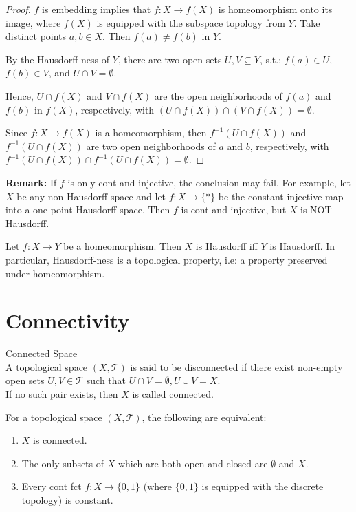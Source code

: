 \begin{proof}
    $f$ is embedding implies that $f:X \rightarrow f(X)$ is homeomorphism onto its image, where $f(X)$ is equipped with the subspace topology from $Y$.
    Take distinct points $a,b \in X$. Then $f(a) \neq f(b)$ in $Y$. 
    
    By the Hausdorff-ness of $Y$, there are two open sets $U,V \subseteq Y$, s.t.: $f(a) \in U$, $f(b) \in V$, and $U \cap V=\emptyset$.
    
    Hence, $U \cap f(X)$ and $V \cap f(X)$ are the open neighborhoods of $f(a)$ and $f(b)$ in $f(X)$, respectively, with $(U\cap f(X)) \cap (V \cap f(X))= \emptyset$.
    
    Since $f: X \rightarrow f(X)$ is a homeomorphism, then $f^{-1}(U \cap f(X))$ and $f^{-1}(U \cap f(X))$ are two open neighborhoods of $a$ and $b$, respectively, with $f^{-1}(U \cap f(X))\cap f^{-1}(U \cap f(X)) = \emptyset$.
\end{proof}

\noindent\textbf{Remark:} If $f$ is only cont and injective, the conclusion may fail. For example, let $X$ be any non-Hausdorff space and let $f: X\rightarrow\{*\}$ be the constant injective map into a one-point Hausdorff space. Then $f$ is cont and injective, but $X$ is NOT Hausdorff.

\begin{corollary}
    Let $f: X \rightarrow Y$ be a homeomorphism. Then $X$ is Hausdorff iff $Y$ is Hausdorff. In particular, Hausdorff-ness is a topological property, i.e: a property preserved under homeomorphism.
\end{corollary}

\section{Connectivity}

\begin{definition}{Connected Space}\\
A topological space $(X, \mathcal{T})$ is said to be disconnected if there exist non-empty open sets $U,V \in \mathcal{T}$ such that $U \cap V = \emptyset , U \cup V = X$.\\
If no such pair exists, then $X$ is called connected.
\end{definition}

\begin{proposition}
    For a topological space $(X, \mathcal{T})$, the following are equivalent:
    \begin{enumerate}
        \item $X$ is connected.
        \item The only subsets of $X$ which are both open and closed are $\emptyset$ and $X$.
        \item Every cont fct $f: X \rightarrow \{0,1\}$ (where $\{0,1\}$ is equipped with the discrete topology) is constant.
    \end{enumerate}
\end{proposition}

